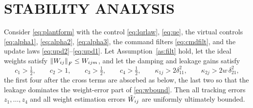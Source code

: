 \section{STABILITY ANALYSIS}
\label{sec:ctrlstability}

\begin{theorem}\label{thm:control}
Consider \eqref{eq:plantform} with the control \eqref{eq:lqrlaw},
\eqref{eq:ue}, the virtual controls \eqref{eq:alpha1}, \eqref{eq:alpha2},
\eqref{eq:alpha3}, the command filters \eqref{eq:cmdfilt}, and the update laws
\eqref{eq:upd2}--\eqref{eq:upd1}. Let Assumption~\ref{as:filt} hold, let the
ideal weights satisfy $\left\lVert W_{ij} \right\rVert_F\le W_{ijm}$, and let the damping and
leakage gains satisfy
\begin{equation}\label{eq:gaincond}
c_1>\tfrac{1}{2},\qquad
c_2>1,\qquad
c_3>\tfrac{1}{2},\qquad
c_4>\tfrac{1}{2},\qquad
\kappa_{1j}>2\delta_{11}^2,\qquad
\kappa_{2j}>2w\,\delta_{21}^2 ,
\end{equation}
the first four after the cross terms are absorbed as below, the last two so
that the leakage dominates the weight-error part of \eqref{eq:wbound}. Then
all tracking errors $z_1,\dots,z_4$ and all weight estimation errors
$\tilde{W}_{ij}$ are uniformly ultimately bounded.
\end{theorem}

